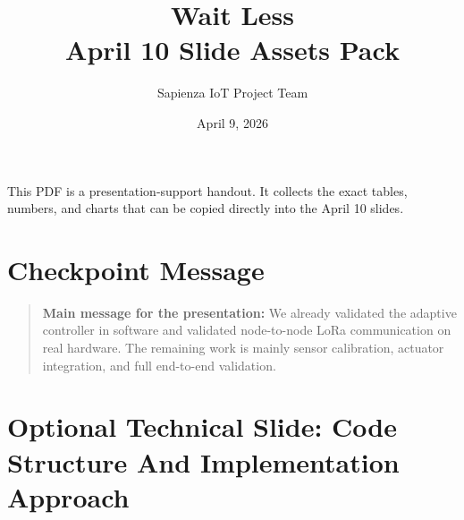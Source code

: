 \documentclass[11pt,a4paper]{article}
\title{Wait Less\\April 10 Slide Assets Pack}
\author{Sapienza IoT Project Team}
\date{April 9, 2026}
\begin{document}
\maketitle

\noindent This PDF is a presentation-support handout. It collects the exact tables, numbers, and charts that can be copied directly into the April 10 slides.

\section{Checkpoint Message}

\begin{quote}
\textbf{Main message for the presentation:} We already validated the adaptive controller in software and validated node-to-node LoRa communication on real hardware. The remaining work is mainly sensor calibration, actuator integration, and full end-to-end validation.
\end{quote}

\section{Optional Technical Slide: Code Structure And Implementation Approach}
\end{document}
